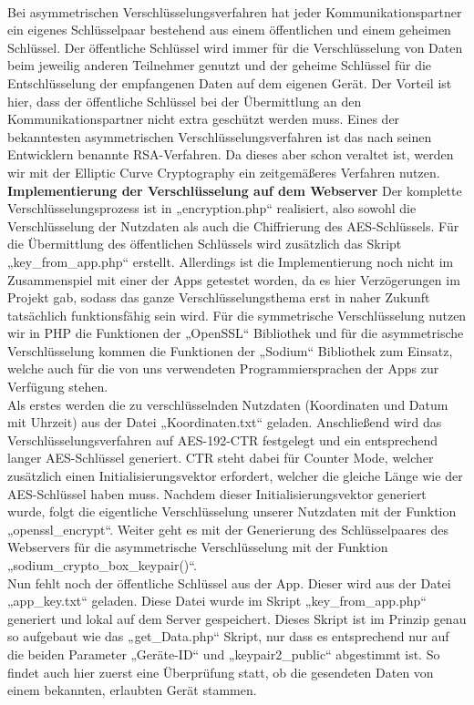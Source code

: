\\
Bei asymmetrischen Verschlüsselungsverfahren hat jeder Kommunikationspartner ein eigenes Schlüsselpaar bestehend aus einem öffentlichen und einem geheimen Schlüssel. Der öffentliche Schlüssel wird immer für die Verschlüsselung von Daten beim jeweilig anderen Teilnehmer genutzt und der geheime Schlüssel für die Entschlüsselung der empfangenen Daten auf dem eigenen Gerät. Der Vorteil ist hier, dass der öffentliche Schlüssel bei der Übermittlung an den Kommunikationspartner nicht extra geschützt werden muss. Eines der bekanntesten asymmetrischen Verschlüsselungsverfahren ist das nach seinen Entwicklern benannte RSA-Verfahren. Da dieses aber schon veraltet ist, werden wir mit der Elliptic Curve Cryptography ein zeitgemäßeres Verfahren nutzen.
\\
\textbf{Implementierung der Verschlüsselung auf dem Webserver }Der komplette Verschlüsselungsprozess ist in „encryption.php“ realisiert, also sowohl die Verschlüsselung der Nutzdaten als auch die Chiffrierung des AES-Schlüssels. Für die Übermittlung des öffentlichen Schlüssels wird zusätzlich das Skript „key\_from\_app.php“ erstellt. Allerdings ist die Implementierung noch nicht im Zusammenspiel mit einer der Apps getestet worden, da es hier Verzögerungen im Projekt gab, sodass das ganze Verschlüsselungsthema erst in naher Zukunft tatsächlich funktionsfähig sein wird. Für die symmetrische Verschlüsselung nutzen wir in PHP die Funktionen der „OpenSSL“ Bibliothek und für die asymmetrische Verschlüsselung kommen die Funktionen der „Sodium“ Bibliothek zum Einsatz, welche auch für die von uns verwendeten Programmiersprachen der Apps zur Verfügung stehen.
\\
Als erstes werden die zu verschlüsselnden Nutzdaten (Koordinaten und Datum mit Uhrzeit) aus der Datei „Koordinaten.txt“ geladen. Anschließend wird das Verschlüsselungsverfahren auf AES-192-CTR festgelegt und ein entsprechend langer AES-Schlüssel generiert. CTR steht dabei für Counter Mode, welcher zusätzlich einen Initialisierungsvektor erfordert, welcher die gleiche Länge wie der AES-Schlüssel haben muss. Nachdem dieser Initialisierungsvektor generiert wurde, folgt die eigentliche Verschlüsselung unserer Nutzdaten mit der Funktion „openssl\_encrypt“. Weiter geht es mit der Generierung des Schlüsselpaares des Webservers für die asymmetrische Verschlüsselung mit der Funktion „sodium\_crypto\_box\_keypair()“.
\\
Nun fehlt noch der öffentliche Schlüssel aus der App. Dieser wird aus der Datei „app\_key.txt“ geladen. Diese Datei wurde im Skript „key\_from\_app.php“ generiert und lokal auf dem Server gespeichert. Dieses Skript ist im Prinzip genau so aufgebaut wie das „get\_Data.php“ Skript, nur dass es entsprechend nur auf die beiden Parameter „Geräte-ID“ und „keypair2\_public“ abgestimmt ist. So findet auch hier zuerst eine Überprüfung statt, ob die gesendeten Daten von einem bekannten, erlaubten Gerät stammen.

